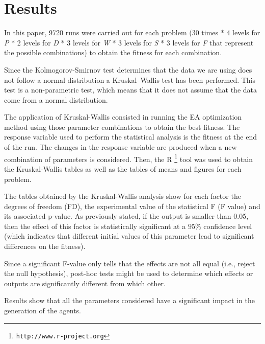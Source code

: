 \documentclass[runningheads,a4paper]{llncs}
\begin{document}

\section{Results}
\label{sec:res}


In this paper, 9720 runs were carried out for each problem (30 times * 4 levels for \emph{P} * 2 levels for \emph{D} * 3 levels for \emph{W} * 3 levels for \emph{S} * 3 levels for \emph{F} that represent the possible combinations) to obtain the fitness for each combination.

Since the Kolmogorov-Smirnov test determines that the data we are using
does not follow a normal distribution a Kruskal–Wallis test has been
performed. This test is a non-parametric test, which means that it
does not assume that the data come from a normal distribution.  %

The application of Kruskal-Wallis consisted in running the EA optimization method using those parameter combinations to obtain the best fitness. 
The response variable used to perform the statistical analysis is the fitness at the end of the run. The changes in the response variable are produced when a new combination of parameters is considered. Then, the {R} \footnote{{\tt http://www.r-project.org}} tool was used to obtain the Kruskal-Wallis tables as well as the tables of means and figures for each problem. 

The tables obtained by the Kruskal-Wallis analysis show for each factor the  degrees of freedom (FD), the experimental value of the statistical F (F value) and its associated p-value.
As previously stated, if the output is smaller than 0.05, then the
effect of this factor is statistically significant at a $95\%$
confidence level (which indicates that different initial values of
this parameter lead to significant differences on the fitness).

Since a significant F-value only tells  that the effects are not all
equal (i.e., reject the null hypothesis), post-hoc tests might be used
to determine which effects or outputs are significantly different from
which other. %

Results show that all the parameters considered have a significant
impact in the generation of the agents. %
\end{document}
